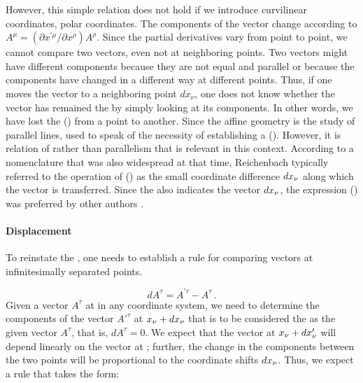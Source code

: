 \documentclass[final]{article}
\renewcommand{\diff}{d}
\begin{document}
However, this simple relation does not hold if we introduce curvilinear coordinates, \eg polar coordinates. The components of the vector change according to $A^{\mu}=\left(\partial x^{\prime \mu} / \partial x^{\rho}\right) A^{\rho}$. Since the partial derivatives vary from point to point, we cannot compare two vectors, even not at neighboring points. Two vectors might have different components because they are not equal and parallel or because the components have changed in a different way at different points. Thus, if one moves the vector to a neighboring point $dx_\nu$, one does not know whether the vector has remained the  by simply looking at its components. In other words, we have lost the  () from a point to another. Since the affine geometry is the study of parallel lines, \citet{Weyl1918a,Weyl1918b} used to speak of the necessity of establishing a  (). However, it is relation of  rather than parallelism that is relevant in this context. According to a nomenclature that was also widespread at that time, Reichenbach typically referred to the operation of  () as the small coordinate difference $dx_{\nu}$ along which the vector is transferred. Since the  also indicates the vector $dx_{\nu}$, the expression  () was preferred by other authors .

\paragraph{Displacement}
%
To reinstate the , one needs to establish a rule for comparing vectors at infinitesimally separated points. 

\begin{equation*}
dA^\tau = A^{\prime\tau}-A^{\tau}\,.
\end{equation*}
%
Given a vector $A^\tau$ at \xn in any coordinate system, we need to determine the components of the vector $A'^\tau$ at $x_{\nu}+dx_{\nu}$ that is to be considered the  as the given vector $A^\tau$, that is, $dA^\tau=0$. We expect that the vector at $\xn+\diff \xnpr$ will depend linearly on the vector at \xn; further, the change in the components between the two points will be proportional to the coordinate shifts $\diff \xn$. Thus, we expect a rule that takes the form:
\end{document}
